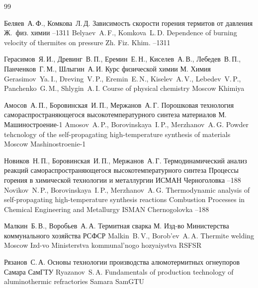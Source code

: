 \begin{thebibliography}{99}

\by Беляев~А.\,Ф., Комкова~Л.\,Д.
\paper Зависимость скорости горения термитов от давления
\jour Ж.~физ. химии
–1311
\misctransl 
\by Belyaev~A.\,F., Komkova~L.\,D.
\paper Dependence of burning velocity of thermites on pressure
\jour Zh. Fiz. Khim.
–1311

\by Герасимов~Я.\,И., Древинг~В.\,П., Еремин~Е.\,Н., Киселев~А.\,В., Лебедев~В.\,П., Панченков~Г.\,М., Шлыгин~А.\,И.
\book Курс физической химии
\publaddr М.
\publ Химия
\misctransl
\by Gerasimov~Ya.\,I., Dreving~V.\,P., Eremin~E.\,N., Kiselev~A.\,V., Lebedev~V.\,P., Panchenko~G.\,M., Shlygin~A.\,I.
\book Course of physical chemistry
\publaddr Moscow
\publ Khimiya



\by Амосов~А.\,П., Боровинская~И.\,П., Мержанов~А.\,Г.
\book Порошковая технология самораспространяющегося высокотемпературного синтеза материалов
\publaddr М.
\publ \mbox{Машиностроение-1}
\misctransl
\by Amosov~A.\,P., Borovinskaya~I.\,P., Merzhanov~A.\,G.
\book Powder tehcnology of the self-propagating high-temperature synthesis of materials
\publaddr Moscow
\publ Mashinostroenie-1

\by Новиков~Н.\,П., Боровинская~И.\,П., Мержанов~А.\,Г.
\paper Термодинамический анализ реакций самораспространяющегося высокотемпературного синтеза
\inbook Процессы горения в химической технологии и металлургии
\publ ИСМАН
\publaddr Черноголовка
--188
\misctransl
\by Novikov~N.\,P., Borovinskaya~I.\,P., Merzhanov~A.\,G.
\paper Thermodynamic analysis of self-propagating high-temperature synthesis reactions
\inbook Combustion Processes in Chemical Engineering and Metallurgy
\publ ISMAN
\publaddr Chernogolovka
--188

\by Малкин~Б.\,В., Воробьев~А.\,А.
\book Термитная сварка
\publaddr М.
\publ Изд-во Министерства коммунального хозяйства РСФСР
\misctransl
\by Malkin~B.\,V., Borob'ev~A.\,A.
\book Thermite welding
\publaddr Moscow
\publ Izd-vo Ministerstva kommunal'nogo hozyaiystva RSFSR

\by Рязанов~С.\,А.
\book Основы технологии производства алюмотермитных огнеупоров
\publaddr Самара
\publ СамГТУ
\misctransl
\by Ryazanov~S.\,A.
\book Fundamentals of production technology of  aluminothermic  refractories
\publaddr Samara
\publ SamGTU


\end{thebibliography}
